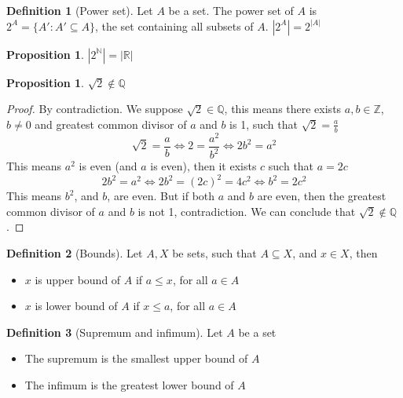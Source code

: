 \documentclass{article}
\newcommand{\fr}[2]{\frac{#1}{#2}}
\theoremstyle{definition}
\newtheorem{definition}{Definition}[section]
\theoremstyle{definition}
\theoremstyle{plain}
\theoremstyle{plain}
\theoremstyle{plain}
\theoremstyle{plain}
\newtheorem{proposition}[theorem]{Proposition}
\theoremstyle{definition}
\theoremstyle{remark}
\theoremstyle{remark}
\theoremstyle{remark}
\theoremstyle{remark}
\newcommand{\N}{\mathbb{N}}
\newcommand{\Z}{\mathbb{Z}}
\newcommand{\Q}{\mathbb{Q}}
\newcommand{\R}{\mathbb{R}}
\begin{document}
\begin{definition}[Power set]
  Let $A$ be a set. The power set of $A$ is $2^A = \{ A' : A' \subseteq A \}$, the set containing all subsets of $A$. $|2^A| = 2^{|A|}$
\end{definition}


\begin{proposition}
  $|2^{\N}| = |\R|$
\end{proposition}


\begin{proposition}
  $\sqrt{2} \notin \Q$
\end{proposition}

\begin{proof}
  By contradiction. We suppose $\sqrt{2} \in \Q$, this means there exists $a, b \in \Z$, $b \neq 0$ and greatest common divisor of $a$ and $b$ is 1, such that $\sqrt{2} = \frac{a}{b}$
  \[
  \sqrt{2} = \fr{a}{b} \iff 2 = \fr{a^2}{b^2} \iff 2b^2 = a^2
  \]
  This means $a^2$ is even (and $a$ is even), then it exists $c$ such that $a = 2c$
  \[
  2b^2 = a^2 \iff 2b^2 = (2c)^2 = 4c^2 \iff b^2 = 2c^2
  \]
  This means $b^2$, and $b$, are even. But if both $a$ and $b$ are even, then the greatest common divisor of $a$ and $b$ is not 1, contradiction. We can conclude that $\sqrt{2} \notin \Q$.
\end{proof}


\begin{definition}[Bounds]
  Let $A, X$ be sets, such that $A \subseteq X$, and $x \in X$, then
  \begin{itemize}
  \item $x$ is upper bound of $A$ if $a \leq x$, for all $a \in A$
  \item $x$ is lower bound of $A$ if $x \leq a$, for all $a \in A$
  \end{itemize}
\end{definition}


\begin{definition}[Supremum and infimum]
  Let $A$ be a set
  \begin{itemize}
  \item The supremum is the smallest upper bound of $A$
  \item The infimum is the greatest lower bound of $A$
  \end{itemize}
\end{definition}
\end{document}
